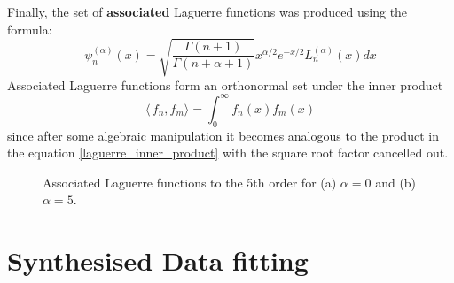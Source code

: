 \documentclass[a4paper]{article}
\numberwithin{equation}{section}
\begin{document}
Finally, the set of \textbf{associated} Laguerre functions was produced using the formula:
\begin{equation} \label{associated_laguerre_definition}
\psi_n^{(\alpha)}(x) = \sqrt{\frac{\Gamma(n+1)}{\Gamma(n+\alpha+1)}} x^{\alpha/2} e^{-x/2} L_n^{(\alpha)}(x) dx
\end{equation}
Associated Laguerre functions form an orthonormal set under the inner product \begin{equation} \label{inner_product}
\langle\,f_n, f_m \rangle = \int_{0}^{\infty}f_n(x)f_m(x)
\end{equation}
since after some algebraic manipulation it becomes analogous to the product in the equation \ref{laguerre_inner_product} with the square root factor cancelled out.

\begin{figure}[!ht]
  \centering
  \quad
  \caption{Associated Laguerre functions to the 5th order for (a) $\alpha=0$ and (b) $\alpha=5$.}
  \label{fig:associatedlaguerre}
\end{figure}

\section{Synthesised Data fitting}
\end{document}
